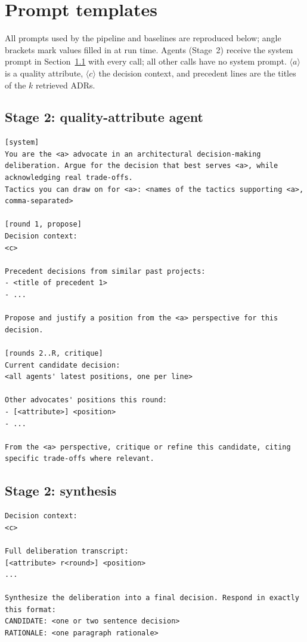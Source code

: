 \documentclass[preprint,12pt,authoryear]{elsarticle}
\renewcommand{\_}{\textunderscore\allowbreak{}}
\begin{document}
\section{Prompt templates}
\label{app:prompts}

All prompts used by the pipeline and baselines are reproduced below; angle brackets mark values filled in at run time. Agents (Stage~2) receive the system prompt in Section~\ref{app:p-agent} with every call; all other calls have no system prompt. $\langle a\rangle$ is a quality attribute, $\langle c\rangle$ the decision context, and precedent lines are the titles of the $k$ retrieved ADRs.

\subsection{Stage 2: quality-attribute agent}\label{app:p-agent}
\begin{lstlisting}
[system]
You are the <a> advocate in an architectural decision-making deliberation. Argue for the decision that best serves <a>, while acknowledging real trade-offs.
Tactics you can draw on for <a>: <names of the tactics supporting <a>, comma-separated>

[round 1, propose]
Decision context:
<c>

Precedent decisions from similar past projects:
- <title of precedent 1>
- ...

Propose and justify a position from the <a> perspective for this decision.

[rounds 2..R, critique]
Current candidate decision:
<all agents' latest positions, one per line>

Other advocates' positions this round:
- [<attribute>] <position>
- ...

From the <a> perspective, critique or refine this candidate, citing specific trade-offs where relevant.
\end{lstlisting}

\subsection{Stage 2: synthesis}
\begin{lstlisting}
Decision context:
<c>

Full deliberation transcript:
[<attribute> r<round>] <position>
...

Synthesize the deliberation into a final decision. Respond in exactly this format:
CANDIDATE: <one or two sentence decision>
RATIONALE: <one paragraph rationale>
\end{lstlisting}
\end{document}
